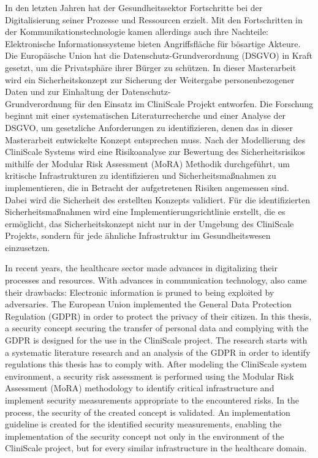 \begin{abstractDE}
In den letzten Jahren hat der Gesundheitssektor Fortschritte bei der Digitalisierung seiner Prozesse und Ressourcen erzielt. Mit den Fortschritten in der Kommunikationstechnologie kamen allerdings auch ihre Nachteile: Elektronische Informationssysteme bieten Angriffsfläche für bösartige Akteure. Die Europäische Union hat die Datenschutz-Grundverordnung (DSGVO) in Kraft gesetzt, um die Privatsphäre ihrer Bürger zu schützen. In dieser Masterarbeit wird ein Sicherheitskonzept zur Sicherung der Weitergabe personenbezogener Daten und zur Einhaltung der Datenschutz-\\Grundverordnung für den Einsatz im CliniScale Projekt entworfen. Die Forschung beginnt mit einer systematischen Literaturrecherche und einer Analyse der DSGVO, um gesetzliche Anforderungen zu identifizieren, denen das in dieser Masterarbeit entwickelte Konzept entsprechen muss. Nach der Modellierung des CliniScale Systems wird eine Risikoanalyse zur Bewertung des Sicherheitsrisikos mithilfe der Modular Risk Assessment (MoRA) Methodik durchgeführt, um kritische Infrastrukturen zu identifizieren und Sicherheitsmaßnahmen zu implementieren, die in Betracht der aufgetretenen Risiken angemessen sind. Dabei wird die Sicherheit des erstellten Konzepts validiert. Für die identifizierten Sicherheitsmaßnahmen wird eine Implementierungsrichtlinie erstellt, die es ermöglicht, das Sicherheitskonzept nicht nur in der Umgebung des CliniScale Projekts, sondern für jede ähnliche Infrastruktur im Gesundheitswesen einzusetzen.
\end{abstractDE}

\vfill

\begin{abstractEN}
In recent years, the healthcare sector made advances in digitalizing their processes and resources. With advances in communication technology, also came their drawbacks: Electronic information is pruned to being exploited by adversaries. The European Union implemented the General Data Protection Regulation (GDPR) in order to protect the privacy of their citizen. In this thesis, a security concept securing the transfer of personal data and complying with the GDPR is designed for the use in the CliniScale project. The research starts with a systematic literature research and an analysis of the GDPR in order to identify regulations this thesis has to comply with. After modeling the CliniScale system environment, a security risk assessment is performed using the Modular Risk Assessment (MoRA) methodology to identify critical infrastructure and implement security measurements appropriate to the encountered risks. In the process, the security of the created concept is validated. An implementation guideline is created for the identified security measurements, enabling the implementation of the security concept not only in the environment of the CliniScale project, but for every similar infrastructure in the healthcare domain.
\end{abstractEN}

\vfill